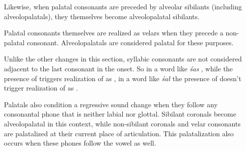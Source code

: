 \documentclass[a4paper,11pt,oneside,openany]{memoir}
\begin{document}
Likewise, when palatal consonants are preceded by alveolar sibilants (including alveolopalatals), they themselves become alveolopalatal sibilants.

\begin{center}
\end{center}

Palatal consonants themselves are realized as velars when they precede a non-palatal consonant. Alveolopalatals are considered palatal for these purposes. 

\begin{center}
\end{center}
\noindent Unlike the other changes in this section, syllabic consonants are not considered adjacent to the last consonant in the onset. So in a word like \textit{\'sas} , while the presence of  triggers realization of  as \bripa{\alvpalesh}, in a word like \textit{\'sa\l}  the presence of \phipa{\latfric\lamino} doesn't trigger realization of  as .

Palatals also condition a regressive sound change when they follow any consonantal phone that is neither labial nor glottal. Sibilant coronals become alveolopalatal in this context, while non-sibilant coronals and velar consonants are palatalized at their current place of articulation. This palatalization also occurs when these phones follow the vowel  as well.
\end{document}
